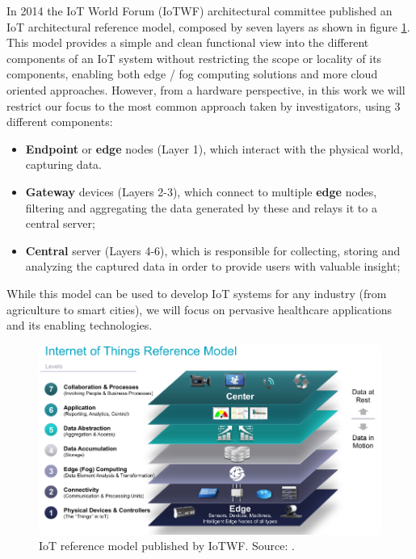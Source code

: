 In 2014 the \acs{IoT} World Forum (IoTWF) architectural committee published an \acs{IoT} architectural reference model, composed by seven layers as shown in figure \ref{fig:iotwf-referencemodel}. This model provides a simple and clean functional view into the different components of an \acs{IoT} system without restricting the scope or locality of its components, enabling both edge / fog computing solutions and more cloud oriented approaches. However, from a hardware perspective, in this work we will restrict our focus to the most common approach taken by investigators, using 3 different components: 

\begin{itemize}
    \item \textbf{Endpoint} or \textbf{edge} nodes (Layer 1), which interact with the physical world, capturing data.
    \item \textbf{Gateway} devices (Layers 2-3), which connect to multiple \textbf{edge} nodes, filtering and aggregating the data generated by these and relays it to a central server; 
    \item \textbf{Central} server (Layers 4-6), which is responsible for collecting, storing and analyzing the captured data in order to provide users with valuable insight;
\end{itemize}

While this model can be used to develop IoT systems for any industry (from agriculture to smart cities), we will focus on pervasive healthcare applications and its enabling technologies. 


\begin{figure}[H]
    \centering
    \includegraphics[width=0.85\linewidth]{images/iotwf-referencemodel.png}
    \caption[IoT reference model published by IoTWF.]{IoT reference model published by IoTWF. Source: \cite{Cisco2014}.}
    \label{fig:iotwf-referencemodel}
\end{figure}

